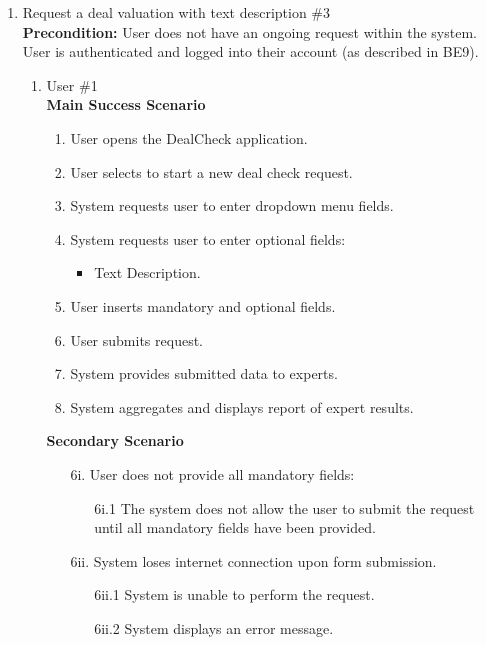 \documentclass[]{article}
\begin{document}
\begin{enumerate}[{\bf {BE}1.}]
\item Request a deal valuation with text description \#3 \\
    {\bf Precondition:} User does not have an ongoing request within the system. User is authenticated and logged into their account (as described in BE9).
    \begin{enumerate}[{\bf VP1.}]
        \item User \#1 \\
        {\bf Main Success Scenario}
        \begin{enumerate}[1.]
            \item User opens the DealCheck application.
            \item User selects to start a new deal check request.
            \item System requests user to enter dropdown menu fields.
            \item System requests user to enter optional fields:
            \begin{itemize}
                \item Text Description.
            \end{itemize}
            \item User inserts mandatory and optional fields.
            \item User submits request.
            \item System provides submitted data to experts.
            \item System aggregates and displays report of expert results.
        \end{enumerate}
        
        {\bf Secondary Scenario} \\
		\begin{enumerate}
			\item [6i.] User does not provide all mandatory fields:
			\begin{enumerate}
				\item [6i.1] The system does not allow the user to submit the request until all mandatory fields have been provided.
			\end{enumerate}
		
			\item [6ii.] System loses internet connection upon form submission.
			\begin{enumerate}
				\item [6ii.1] System is unable to perform the request.
				\item [6ii.2] System displays an error message.
			\end{enumerate}
		

\end{enumerate}
\end{enumerate}
\end{enumerate}
\end{document}
